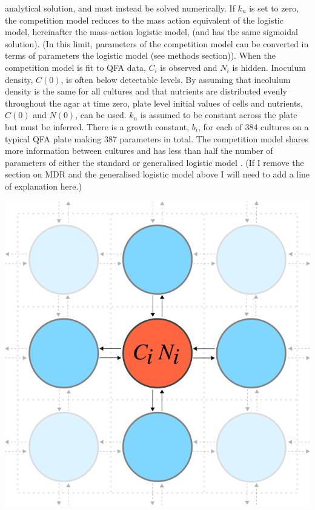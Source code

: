 analytical solution, and must instead be solved numerically. If
\(k_{n}\) is set to zero, the competition model reduces to the mass
action equivalent of the logistic model, hereinafter the mass-action
logistic model, (and has the same sigmoidal solution). (In this limit,
parameters of the competition model can be converted in terms of
parameters the logistic model (see methods section)).
When the competition model is fit to QFA data, \(C_{i}\) is observed
and \(N_{i}\) is hidden. Inoculum density, \(C(0)\), is often
below detectable levels. By assuming that incolulum density is the
same for all cultures and that nutrients are distributed evenly
throughout the agar at time zero, plate level initial values of cells
and nutrients, \(C(0)\) and \(N(0)\), can be used. \(k_{n}\)
is assumed to be constant across the plate but must be inferred. There
is a growth constant, \(b_{i}\), for each of 384 cultures on a typical
QFA plate making 387 parameters in total. The competition model shares
more information between cultures and has less than half the number of
parameters of either the standard or generalised logistic model
\citep{Banks2012,qfa2016}. (If I remove the section on MDR and the
generalised logistic model above I will need to add a line of
explanation here.)
\begin{Figure}
  \centering
  \includegraphics[width=\linewidth]{comp_model/comp_model_schematic2}
  \label{fig:comp_model_schematic}
\end{Figure}

